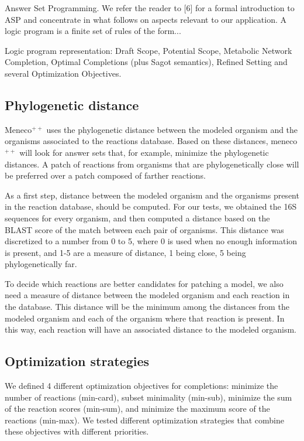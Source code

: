 \documentclass{article}
\newcommand{\Meneco}{Meneco$^{++}$\xspace}
\newcommand{\meneco}{meneco$^{++}$\xspace}
\begin{document}
Answer Set Programming. We refer the reader to [6] for a formal introduction to ASP and concentrate in what follows on aspects relevant to our application. A logic program is a finite set of rules of the form...

Logic program representation: Draft Scope, Potential Scope, Metabolic Network Completion, Optimal Completions (plus Sagot semantics), Refined Setting and several Optimization Objectives.




\subsection{Phylogenetic distance}

\Meneco uses the phylogenetic distance between the modeled organism and the organisms associated to the reactions database. Based on these distances, \meneco will look for answer sets that, for example, minimize the phylogenetic distances. A patch of reactions from organisms that are phylogenetically close will be preferred over a patch composed of farther reactions.

As a first step, distance between the modeled organism and the organisms present in the reaction database, should be computed. For our tests, we obtained the 16S sequences for every organism, and then computed a distance based on the BLAST score of the match between each pair of organisms. This distance was discretized to a number from 0 to 5, where 0 is used when no enough information is present, and 1-5 are a measure of distance, 1 being close, 5 being phylogenetically far.

To decide which reactions are better candidates for patching a model, we also need a measure of distance between the modeled organism and each reaction in the database. This distance will be the minimum among the distances from the modeled organism and each of the organism where that reaction is present. In this way, each reaction will have an associated distance to the modeled organism.

\subsection{Optimization strategies}

We defined 4 different optimization objectives for completions: 
minimize the number of reactions (min-card),
subset minimality (min-sub), 
minimize the sum of the reaction scores (min-sum), and  
minimize the maximum score of the reactions (min-max).
We tested different optimization strategies that combine these objectives with different priorities.
\end{document}
